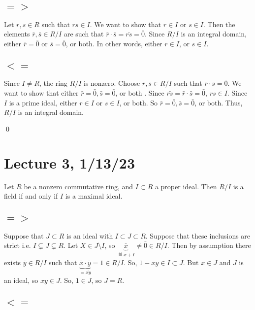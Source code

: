 \documentclass[x11names,reqno,14pt]{extarticle}
\begin{document}
\subsection*{$=>$} Let $r, s \in R$ such that $rs \in I$. We want to show that $r \in I$ or $s \in I$. Then the elements $\bar{r},\bar{s} \in R/I$ are such that $\bar{r}\cdot\bar{s} = \bar{rs} = \bar{0}$. Since $R/I$ is an integral domain, either $\bar{r} = \bar{0}$ or $\bar{s} = \bar{0}$, or both. In other words, either $r \in I$, or $s \in I$. 

\subsection*{$<=$} Since $I\neq R$, the ring $R/I$ is nonzero. Choose $\bar{r},\bar{s} \in R/I$ such that $\bar{r}\cdot\bar{s} =\bar{0}$. We want to show that either $\bar{r} = \bar{0}, \bar{s} = \bar{0}$, or both . Since $\bar{rs} = \bar{r}\cdot\bar{s}=\bar{0}$, $rs \in I$. Since $I$ is a prime ideal, either $r \in I$ or $s \in I$, or both. So $\bar{r} = \bar{0}, \bar{s} = \bar{0}$, or both. Thus, $R/I$ is an integral domain. 

\qed

\section*{Lecture 3, 1/13/23}

\prop

Let $R$ be a nonzero commutative ring, and $I\subset R$ a proper ideal. Then $R/I$ is a field if and only if $I$ is a maximal ideal.

\proof

\subsection*{$=>$}

Suppose that $J\subset R$ is an ideal with $I \subset J \subset R$. Suppose that these inclusions are strict i.e. $I\subsetneq J \subsetneq R$. Let $X \in J\setminus I$, so $\underbrace{\bar{x}}_{\eqdef x + I} \neq\bar{0}\in R/I$. Then by assumption there exists $\bar{y} \in R/I$ such that $\underbrace{\bar{x}\cdot\bar{y}}_{=\bar{xy}} = \bar{1}\in R/I$. So, $1 - xy \in I \subset J$. But $x \in J$ and $J$ is an ideal, so $xy \in J$. So, $1 \in J$, so $J = R$.

\subsection*{$<=$}
\end{document}
